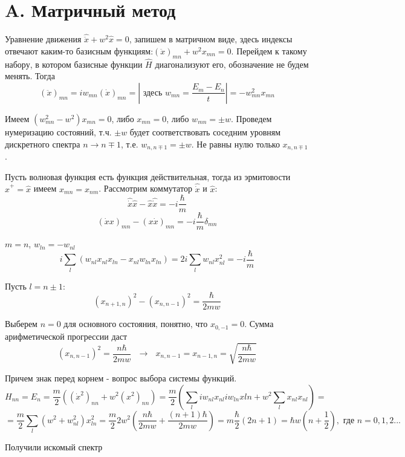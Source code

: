 \section{A. Матричный метод}
\par Уравнение движения $\hat{\ddot{x}} + w^2 \hat{x}=0$, запишем в матричном виде, здесь индексы отвечают каким-то базисным функциям:$(\ddot{x})_{mn} + w^2 x_{mn}=0$. Перейдем к такому набору, в котором базисные функции $\hat{H}$ диагонализуют его, обозначение не будем менять. Тогда
$$(\ddot{x})_{mn} = i w_{mn}(\dot{x})_{mn}=\left|\text{ здесь }w_{mn}=\frac{E_m-E_n}{t} \right|= - w^2_{mn}x_{mn}$$
\par Имеем $(w^2_{mn}-w^2)x_{mn} =0$, либо $x_{mn} =0$, либо $w_{mn}=\pm w$. Проведем нумеризацию состояний, т.ч. $\pm w$ будет соответствовать соседним уровням дискретного спектра $n \rightarrow n\mp 1$, т.е. $w_{n, n\mp1}=\pm w$. Не равны нулю только $x_{n, n\mp1}$.
\par Пусть волновая функция есть функция действительная, тогда из эрмитовости $\hat{x}^+=\hat{x}$ имеем $x_{mn}=x_{nm}$. Рассмотрим коммутатор $\hat{\dot{x}}$ и $\hat{{x}}$:
$$\hat{\dot{x}}\hat{{x}}- \hat{{x}}\hat{\dot{x}} = -i \frac{\hbar}{m} $$
$$(\dot{x} x)_{mn} - (x\dot{x} )_{mn}=-i \frac{\hbar}{m}  \delta_{mn}$$
\par $m=n$, $w_{ln}=-w_{nl}$
$$i \sum_l (w_{nl} x_{nl}x_{ln} - x_{nl}w_{ln}x_{ln})= 2 i \sum_l w_{nl}x^2_{nl} = -i \frac{\hbar}{m} $$
\par Пусть $l = n \pm 1$:
$$(x_{n+1, n})^2 - (x_{n, n-1})^2 = \frac{\hbar}{2mw}$$
\par Выберем $n=0$ для основного состояния, понятно, что $x_{0, -1}=0$. Сумма арифметической прогрессии даст
$$(x_{n, n-1})^2 =\frac{n \hbar}{2mw} \text{ } \rightarrow  \text{ } x_{n, n-1}=x_{n-1, n}= \sqrt{\frac{n \hbar}{2mw} }$$
\par Причем знак перед корнем - вопрос выбора системы функций.
$$H_{nn}=E_n=\frac{m}{2} \left((\dot{x}^2)_{nn}+w^2(x^2)_{nn} \right)= \frac{m}{2} \left(\sum_l i w_{nl}x_{nl}iw_{ln}x{ln}+w^2\sum_l x_{nl}x_{nl} \right)=$$
$$=\frac{m}{2} \sum_l (w^2+w^2_{nl})x^2_{ln} =\frac{m}{2} 2w^2 \left(\frac{n \hbar}{2mw} + \frac{(n+1) \hbar}{2mw} \right) = m \frac{\hbar}{2} (2n+1)=\hbar w \left(n + \frac{1}{2} \right), \text{ где } n = 0,1,2...$$
\par Получили искомый спектр 
